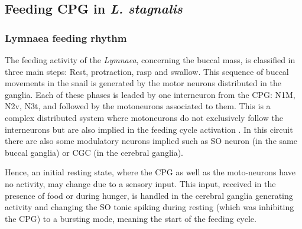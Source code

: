 

\subsection{Feeding CPG in \textit{L. stagnalis}}
%


\subsubsection{Lymnaea feeding rhythm}

The feeding activity of the \textit{Lymnaea}, concerning the buccal mass, is classified in three main steps: Rest, protraction, rasp and swallow. This sequence of buccal movements in the snail is generated by the motor neurons distributed in the ganglia. Each of these phases is leaded by one interneuron from the CPG: N1M, N2v, N3t, and followed by the motoneurons associated to them. This is a complex distributed system where motoneurons do not exclusively follow the interneurons but are also implied in the feeding cycle activation \cite{Staras1998}. In this circuit there are also some modulatory neurons implied such as SO neuron (in the same buccal ganglia) or CGC (in the cerebral ganglia). 

Hence, an initial resting state, where the CPG as well as the moto-neurons have no activity, may change due to a sensory input. This input, received in the presence of food or during hunger, is handled in the cerebral ganglia generating activity and changing the SO tonic spiking during resting (which was inhibiting the CPG) to a bursting mode, meaning the start of the feeding cycle.


